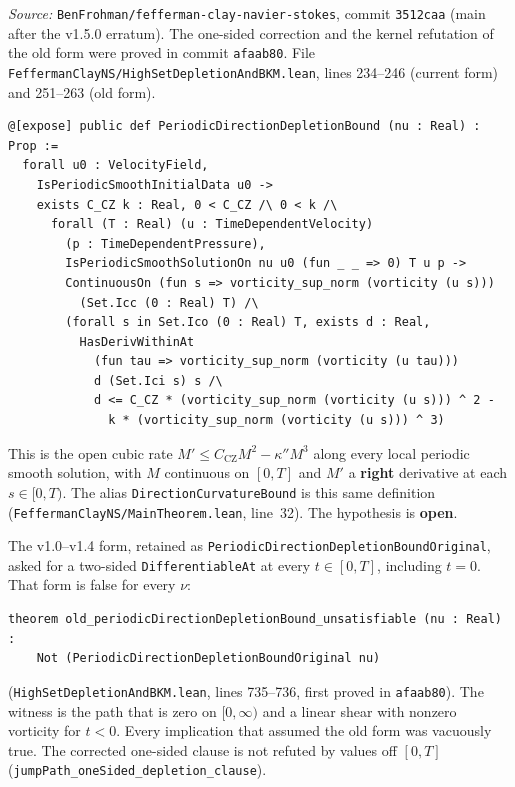 \documentclass[11pt]{article}
\theoremstyle{plain}
\theoremstyle{definition}
\theoremstyle{remark}
\begin{document}
\textit{Source:} \texttt{BenFrohman/\hspace{0pt}fefferman-clay-navier-stokes}, commit \texttt{3512caa} (main after the v1.5.0 erratum). The one-sided correction and the kernel refutation of the old form were proved in commit \texttt{afaab80}. File \texttt{FeffermanClayNS/\hspace{0pt}HighSetDepletionAndBKM.\hspace{0pt}lean}, lines 234--246 (current form) and 251--263 (old form).
\begin{lstlisting}
@[expose] public def PeriodicDirectionDepletionBound (nu : Real) : Prop :=
  forall u0 : VelocityField,
    IsPeriodicSmoothInitialData u0 ->
    exists C_CZ k : Real, 0 < C_CZ /\ 0 < k /\
      forall (T : Real) (u : TimeDependentVelocity)
        (p : TimeDependentPressure),
        IsPeriodicSmoothSolutionOn nu u0 (fun _ _ => 0) T u p ->
        ContinuousOn (fun s => vorticity_sup_norm (vorticity (u s)))
          (Set.Icc (0 : Real) T) /\
        (forall s in Set.Ico (0 : Real) T, exists d : Real,
          HasDerivWithinAt
            (fun tau => vorticity_sup_norm (vorticity (u tau)))
            d (Set.Ici s) s /\
            d <= C_CZ * (vorticity_sup_norm (vorticity (u s))) ^ 2 -
              k * (vorticity_sup_norm (vorticity (u s))) ^ 3)
\end{lstlisting}
This is the open cubic rate \(M'\le C_{\mathrm{CZ}}M^{2}-\kappa''M^{3}\) along every local periodic smooth solution, with \(M\) continuous on \([0,T]\) and \(M'\) a \textbf{right} derivative at each \(s\in[0,T)\). The alias \texttt{DirectionCurvatureBound} is this same definition (\texttt{FeffermanClayNS/\hspace{0pt}MainTheorem.\hspace{0pt}lean}, line~32). The hypothesis is \textbf{open}.

The v1.0--v1.4 form, retained as \texttt{PeriodicDirectionDepletionBoundOriginal}, asked for a two-sided \texttt{DifferentiableAt} at every \(t\in[0,T]\), including \(t=0\). That form is false for every \(\nu\):
\begin{lstlisting}
theorem old_periodicDirectionDepletionBound_unsatisfiable (nu : Real) :
    Not (PeriodicDirectionDepletionBoundOriginal nu)
\end{lstlisting}
(\texttt{HighSetDepletionAndBKM.\hspace{0pt}lean}, lines 735--736, first proved in \texttt{afaab80}). The witness is the path that is zero on \([0,\infty)\) and a linear shear with nonzero vorticity for \(t<0\). Every implication that assumed the old form was vacuously true. The corrected one-sided clause is not refuted by values off \([0,T]\) (\texttt{jumpPath\_\hspace{0pt}oneSided\_\hspace{0pt}depletion\_\hspace{0pt}clause}).
\end{document}
